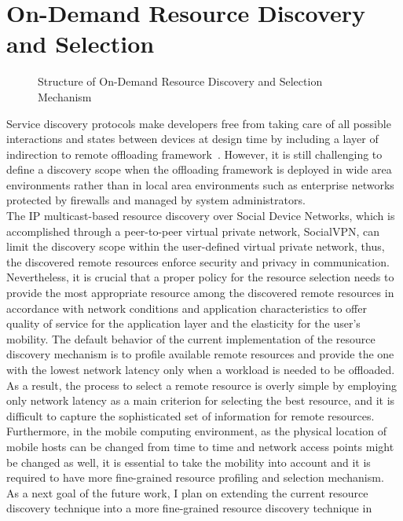\section{On-Demand Resource Discovery and Selection}
\label{summary:selection}
%
\begin{figure}
\centering
{}
\caption{Structure of On-Demand Resource Discovery and Selection
Mechanism}
\label{fig:ondemand}
\end{figure}
%
Service discovery protocols make developers free from taking care of all
possible interactions and states between devices at design time by
including a layer of indirection to remote offloading
framework~\cite{feng}.
%
However, it is still challenging to define a discovery scope when the
offloading framework is deployed in wide area environments rather than
in local area environments such as enterprise networks protected by
firewalls and managed by system administrators.\\
%
The IP multicast-based resource discovery over Social Device
Networks, which is accomplished through a peer-to-peer virtual private network,
SocialVPN, can limit the discovery scope within the user-defined virtual
private network, thus, the discovered remote resources enforce security
and privacy in communication.
%
Nevertheless, it is crucial that a proper policy for the resource
selection needs to provide the most appropriate resource among the discovered
remote resources in accordance with network conditions and application
characteristics to offer quality of service for the application layer
and the elasticity for the user's mobility. 
%
The default behavior of the current implementation of the resource 
discovery mechanism is to profile available remote resources and 
provide the one with the lowest network latency only when a workload 
is needed to be offloaded.
%
As a result, the process to select a remote resource is overly simple by
employing only network latency as a main criterion for selecting the
best resource, and it is difficult to capture the sophisticated set of
information for remote resources.
%
Furthermore, in the mobile computing environment, as the physical
location of mobile hosts can be changed from time to time and
network access points might be changed as well, it is essential to take the
mobility into account and it is required to have more fine-grained
resource profiling and selection mechanism.\\
%
As a next goal of the future work, I plan on extending the current resource 
discovery technique into a more fine-grained resource discovery technique in 
